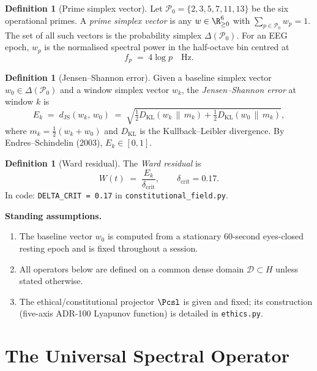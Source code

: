 \documentclass[12pt,a4paper]{article}
\theoremstyle{plain}
\theoremstyle{definition}
\newtheorem{definition}[theorem]{Definition}
\newcommand{\dJS}{d_{\mathrm{JS}}}
\begin{document}
\begin{definition}[Prime simplex vector]
  \label{def:simplex}
  Let $\mathcal{P}_0 = \{2,3,5,7,11,13\}$ be the six operational primes.
  A \emph{prime simplex vector} is any $w\in\R^6_{\ge0}$ with
  $\sum_{p\in\mathcal{P}_0} w_p = 1$.  The set of all such vectors is the
  probability simplex $\Delta(\mathcal{P}_0)$.  For an EEG epoch, $w_p$
  is the normalised spectral power in the half-octave bin centred at
  \[
    f_p \;=\; 4\log p \quad\text{Hz}.
  \]
\end{definition}

\begin{definition}[Jensen--Shannon error]
  \label{def:jse}
  Given a baseline simplex vector $w_0\in\Delta(\mathcal{P}_0)$ and a
  window simplex vector $w_k$, the \emph{Jensen--Shannon error} at window
  $k$ is
  \[
    E_k \;=\; \dJS(w_k,\,w_0)
          \;=\; \sqrt{\tfrac{1}{2}D_{\mathrm{KL}}(w_k\,\|\,m_k)
                      +\tfrac{1}{2}D_{\mathrm{KL}}(w_0\,\|\,m_k)},
  \]
  where $m_k = \tfrac{1}{2}(w_k+w_0)$ and $D_{\mathrm{KL}}$ is the
  Kullback--Leibler divergence.  By Endres--Schindelin (2003),
  $E_k\in[0,1]$.
\end{definition}

\begin{definition}[Ward residual]
  \label{def:ward}
  The \emph{Ward residual} is
  \[
    W(t) \;=\; \frac{E_k}{\delta_{\mathrm{crit}}},\qquad
    \delta_{\mathrm{crit}} = 0.17.
  \]
  In code: \texttt{DELTA\_CRIT = 0.17} in \texttt{constitutional\_field.py}.
\end{definition}

\medskip\noindent
\textbf{Standing assumptions.}
\begin{enumerate}[label=\textbf{(SA\arabic*)}]
  \item\label{sa1} The baseline vector $w_0$ is computed from a stationary
        60-second eyes-closed resting epoch and is fixed throughout a session.
  \item\label{sa2} All operators below are defined on a common dense domain
        $\mathcal{D}\subset H$ unless stated otherwise.
  \item\label{sa3} The ethical/constitutional projector $\Pcsl$ is given and
        fixed; its construction (five-axis ADR-100 Lyapunov function) is
        detailed in \texttt{ethics.py}.
\end{enumerate}

\section{The Universal Spectral Operator}
\label{sec:uso}
\end{document}

